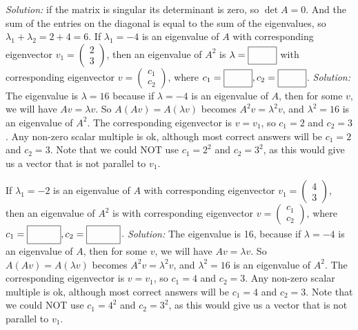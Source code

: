\begin{parts}
        \ifnum {} {\color{DarkBlue} \textit{Solution:} if the matrix is singular its determinant is zero, so $\det A =0$. And the sum of the entries on the diagonal is equal to the sum of the eigenvalues, so $\lambda_1 + \lambda_2 = 2 + 4 = 6$.  } \fi      
    \fi 
    \ifnum {}
         If $\lambda_1 = -4$ is an eigenvalue of $A$ with corresponding eigenvector $v_1 = \begin{pmatrix} 2\\3\end{pmatrix}$, then an eigenvalue of $A^2$ is $\lambda = \framebox{\strut\hspace{.8cm}}$ with corresponding eigenvector $v = \begin{pmatrix} c_1\\c_2 \end{pmatrix}$, where $c_1 = \framebox{\strut\hspace{.8cm}}, c_2= \framebox{\strut\hspace{.8cm}}$. 
        \ifnum {} {\color{DarkBlue} \textit{Solution:} The eigenvalue is $\lambda = 16$ because if $\lambda = -4$ is an eigenvalue of $A$, then for some $v$, we will have $Av=\lambda v$. So $A(Av) = A(\lambda v)$ becomes $A^2v = \lambda^2v$, and $\lambda^2 = 16$ is an eigenvalue of $A^2$. The corresponding eigenvector is $v = v_1$, so $c_1 =2$ and $c_2=3$. Any non-zero scalar multiple is ok, although most correct answers will be $c_1 =2$ and $c_2=3$. Note that we could NOT use $c_1 =2^2$ and $c_2=3^2$, as this would give us a vector that is not parallel to $v_1$. } 
        \fi
    \fi    

    \ifnum {}
         If $\lambda_1 = -2$ is an eigenvalue of $A$ with corresponding eigenvector $v_1 = \begin{pmatrix} 4\\3\end{pmatrix}$, then an eigenvalue of $A^2$ is \framebox{\strut\hspace{1cm}} with corresponding eigenvector $v = \begin{pmatrix} c_1\\c_2 \end{pmatrix}$, where $c_1 = \framebox{\strut\hspace{1cm}}, c_2= \framebox{\strut\hspace{1cm}}$. 
        \ifnum {} {\color{DarkBlue} \textit{Solution:} The eigenvalue is 16, because if $\lambda = -4$ is an eigenvalue of $A$, then for some $v$, we will have $Av=\lambda v$. So $A(Av) = A(\lambda v)$ becomes $A^2v = \lambda^2v$, and $\lambda^2 = 16$ is an eigenvalue of $A^2$. The corresponding eigenvector is $v = v_1$, so $c_1 =4$ and $c_2=3$. Any non-zero scalar multiple is ok, although most correct answers will be $c_1 =4$ and $c_2=3$. Note that we could NOT use $c_1 =4^2$ and $c_2=3^2$, as this would give us a vector that is not parallel to $v_1$. } 
        \fi
    \fi        


\end{parts}
